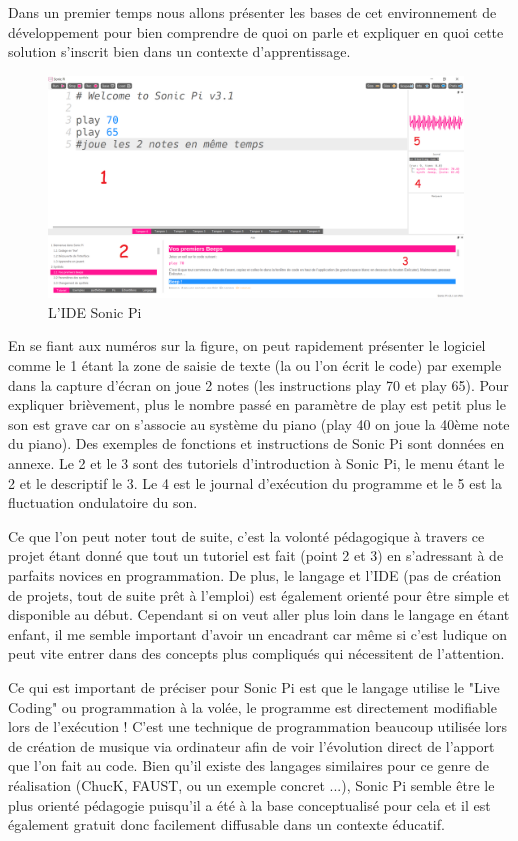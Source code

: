 Dans un premier temps nous allons présenter les bases de cet environnement de développement pour bien comprendre de quoi on parle et expliquer en quoi cette solution s'inscrit bien dans un contexte d'apprentissage.

\newpage

\begin{figure}[!htb]
  \centering
  \includegraphics[width=110mm,scale=0.5]{images/sonic_pi_ide.png}
  \caption{L'IDE Sonic Pi}
  \label{fig:boat1}
\end{figure}

En se fiant aux numéros sur la figure, on peut rapidement présenter le logiciel comme le 1 étant la zone de saisie de texte (la ou l'on écrit le code) par exemple dans la capture d'écran on joue 2 notes (les instructions play 70 et play 65). Pour expliquer brièvement, plus le nombre passé en paramètre de play est petit plus le son est grave car on s'associe au système du piano (play 40 on joue la 40ème note du piano). Des exemples de fonctions et instructions de Sonic Pi sont données en annexe. Le 2 et le 3 sont des tutoriels d'introduction à Sonic Pi, le menu étant le 2 et le descriptif le 3. Le 4 est le journal d'exécution du programme et le 5 est la fluctuation ondulatoire du son.

Ce que l'on peut noter tout de suite, c'est la volonté pédagogique à travers ce projet étant donné que tout un tutoriel est fait (point 2 et 3) en s'adressant à de parfaits novices en programmation. De plus, le langage et l'IDE (pas de création de projets, tout de suite prêt à l'emploi) est également orienté pour être simple et disponible au début. Cependant si on veut aller plus loin dans le langage en étant enfant, il me semble important d'avoir un encadrant car même si c'est ludique on peut vite entrer dans des concepts plus compliqués qui nécessitent de l'attention.

Ce qui est important de préciser pour Sonic Pi est que le langage utilise le "Live Coding" ou programmation à la volée, le programme est directement modifiable lors de l'exécution ! C'est une technique de programmation beaucoup utilisée lors de création de musique via ordinateur afin de voir l'évolution direct de l'apport que l'on fait au code. Bien qu'il existe des langages similaires pour ce genre de réalisation (ChucK, FAUST, ou un exemple concret \cite{21} ...), Sonic Pi semble être le plus orienté pédagogie puisqu'il a été à la base conceptualisé pour cela et il est également gratuit donc facilement diffusable dans un contexte éducatif.

